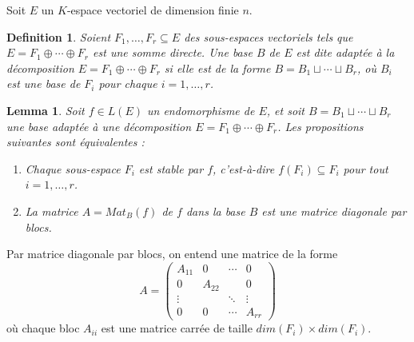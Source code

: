 \documentclass{article}
\newtheorem{lemma}{Lemma}
\newtheorem{definition}{Definition}
\begin{document}
Soit $E$ un $K$-espace vectoriel de dimension finie $n$.

\begin{definition}
Soient $F_1, \ldots, F_r \subseteq E$ des sous-espaces vectoriels tels que $E = F_1 \oplus \cdots \oplus F_r$ est une somme directe. Une base $B$ de $E$ est dite adaptée à la décomposition $E = F_1 \oplus \cdots \oplus F_r$ si elle est de la forme $B = B_1 \sqcup \cdots \sqcup B_r$, où $B_i$ est une base de $F_i$ pour chaque $i = 1, \ldots, r$.
\end{definition}

\begin{lemma}
Soit $f \in L(E)$ un endomorphisme de $E$, et soit $B = B_1 \sqcup \cdots \sqcup B_r$ une base adaptée à une décomposition $E = F_1 \oplus \cdots \oplus F_r$. Les propositions suivantes sont équivalentes :
\begin{enumerate}
    \item Chaque sous-espace $F_i$ est stable par $f$, c'est-à-dire $f(F_i) \subseteq F_i$ pour tout $i = 1, \ldots, r$.
    \item La matrice $A = Mat_B(f)$ de $f$ dans la base $B$ est une matrice diagonale par blocs.
\end{enumerate}
\end{lemma}
Par matrice diagonale par blocs, on entend une matrice de la forme
\[ A = \begin{pmatrix}
A_{11} & 0 & \cdots & 0 \\
0 & A_{22} & & 0 \\
\vdots & & \ddots & \vdots \\
0 & 0 & \cdots & A_{rr}
\end{pmatrix} \]
où chaque bloc $A_{ii}$ est une matrice carrée de taille $dim(F_i) \times dim(F_i)$.
\end{document}
